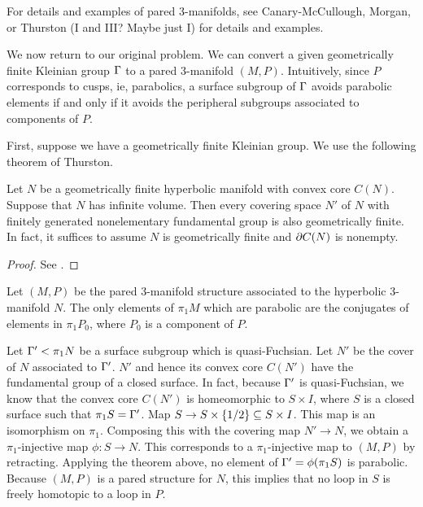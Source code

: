 For details and examples of pared 3-manifolds, see Canary-McCullough, Morgan,
or Thurston (I and III? Maybe just I) for details and examples.

We now return to our original problem. We can convert a given geometrically
finite Kleinian group $\Gamma$ to a pared 3-manifold $(M,P)$. Intuitively, since
$P$ corresponds to cusps, ie, parabolics, a surface subgroup of $\Gamma$ avoids
parabolic elements if and only if it avoids the peripheral subgroups associated
to components of $P$.

First, suppose we have a geometrically finite Kleinian group.  We use the
following theorem of Thurston.

\begin{thm}

Let $N$ be a geometrically finite hyperbolic manifold with convex core $C(N)$.
Suppose that $N$ has infinite volume. Then every covering space $N'$ of $N$
with finitely generated nonelementary fundamental group is also geometrically
finite. In fact, it suffices to assume $N$ is geometrically finite and $\partial
C(N)$ is nonempty.


\end{thm}

\begin{proof}

See \cite{Mo}. %

\end{proof}


Let $(M,P)$ be the pared 3-manifold structure associated to the hyperbolic
3-manifold $N$. The only elements of $\pi_1M$ which are parabolic are the
conjugates of elements in $\pi_1P_0$, where $P_0$ is a component of $P$.

Let $\Gamma' < \pi_1N$ be a surface subgroup which is quasi-Fuchsian. Let $N'$ be
the cover of $N$ associated to $\Gamma'$. $N'$ and hence its convex core $C(N')$
have the fundamental group of a closed surface. In fact, because $\Gamma'$ is
quasi-Fuchsian, we know that the convex core $C(N')$ is homeomorphic to $S
\times I$, where $S$ is a closed surface such that $\pi_1S = \Gamma'$.  Map $S \to
S \times \{1/2\} \subseteq S \times I$. This map is an isomorphism on $\pi_1$.
Composing this with the covering map $N' \to N$, we obtain a $\pi_1$-injective
map $\phi \colon S \to N$.  This corresponds to a $\pi_1$-injective map to
$(M,P)$ by retracting.  Applying the theorem above, no element of
$\Gamma'=\phi(\pi_1S)$ is parabolic.  Because $(M,P)$ is a pared structure for
$N$, this implies that no loop in $S$ is freely homotopic to a loop in $P$.

